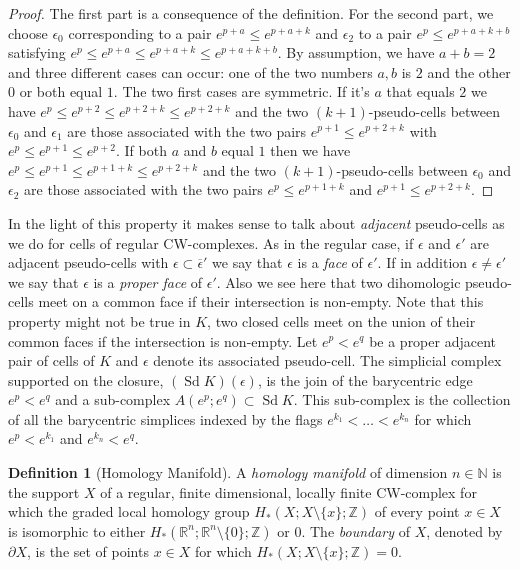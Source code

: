 \documentclass[10pt]{amsart}
\theoremstyle{definition}
\newtheorem{defi}[theo]{Definition}
\numberwithin{equation}{section}
\numberwithin{figure}{section}
\newcommand{\R}{\mathbb{R}}
\newcommand{\Z}{\mathbb{Z}}
\newcommand{\N}{\mathbb{N}}
\DeclareMathOperator{\Sd}{Sd}
\begin{document}
\begin{proof}
The first part is a consequence of the definition. For the second part, we choose $\epsilon_0$ corresponding to a pair $e^{p+a}\leq e^{p+a+k}$ and $\epsilon_2$ to a pair $e^p\leq e^{p+a+k+b}$ satisfying $e^p\leq e^{p+a}\leq e^{p+a+k}\leq e^{p+a+k+b}$. By assumption, we have $a+b=2$ and three different cases can occur: one of the two numbers $a,b$ is $2$ and the other $0$ or both equal $1$. The two first cases are symmetric. If it's $a$ that equals $2$ we have $e^p\leq e^{p+2}\leq e^{p+2+k}\leq e^{p+2+k}$ and the two $(k+1)$-pseudo-cells between $\epsilon_0$ and $\epsilon_1$ are those associated with the two pairs $e^{p+1}\leq e^{p+2+k}$ with $e^p\leq e^{p+1}\leq e^{p+2}$. If both $a$ and $b$ equal $1$ then we have $e^p\leq e^{p+1}\leq e^{p+1+k}\leq e^{p+2+k}$ and the two $(k+1)$-pseudo-cells between $\epsilon_0$ and $\epsilon_2$ are those associated with the two pairs $e^p\leq e^{p+1+k}$ and $e^{p+1}\leq e^{p+2+k}$.
\end{proof}

In the light of this property it makes sense to talk about \emph{adjacent} pseudo-cells as we do for cells of regular CW-complexes. As in the regular case, if $\epsilon$ and $\epsilon'$ are adjacent pseudo-cells with $\epsilon\subset\overline{\epsilon}'$ we say that $\epsilon$ is a \emph{face} of $\epsilon'$. If in addition $\epsilon\neq\epsilon'$ we say that $\epsilon$ is a \emph{proper face} of $\epsilon'$. Also we see here that two dihomologic pseudo-cells meet on a common face if their intersection is non-empty. Note that this property might not be true in $K$, two closed cells meet on the union of their common faces if the intersection is non-empty. Let $e^p< e^q$ be a proper adjacent pair of cells of $K$ and $\epsilon$ denote its associated pseudo-cell. The simplicial complex supported on the closure, $(\Sd K)(\epsilon)$, is the join of the barycentric edge $e^p<e^q$ and a sub-complex $A(e^p;e^q)\subset\Sd K$. This sub-complex is the collection of all the barycentric simplices indexed by the flags $e^{k_1}<\dots<e^{k_{n}}$ for which $e^p<e^{k_1}$ and $e^{k_{n}}<e^q$.

\begin{defi}[Homology Manifold]\label{definition:homo_man}
A \emph{homology manifold} of dimension $n\in\N$ is the support $X$ of a regular, finite dimensional, locally finite CW-complex for which the graded local homology group $H_*(X;X\setminus\{x\};\Z)$ of every point $x\in X$ is isomorphic to either $H_*(\R^n;\R^n\setminus \{0\};\Z)$ or $0$. The \emph{boundary} of $X$, denoted by $\partial X$, is the set of points $x\in X$ for which $H_*(X;X\setminus\{x\};\Z)=0$.
\end{defi}
\end{document}
